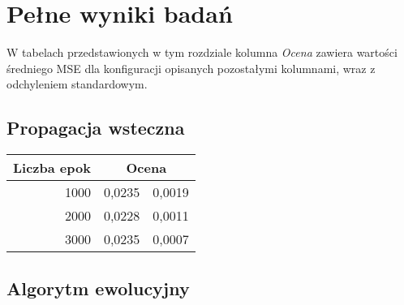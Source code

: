 \documentclass[11pt,a4paper,oneside]{report}
\begin{document}
\appendix 
\chapter{Pełne wyniki badań}
\label{chap:appendix}

W tabelach przedstawionych w tym rozdziale kolumna \textit{Ocena} zawiera wartości średniego MSE dla konfiguracji opisanych pozostałymi kolumnami, wraz z odchyleniem standardowym.

\section{Propagacja wsteczna}

\begin{center}
	\begin{longtable}{|r|r@{$\pm$}r|}
		\hline
		\multicolumn{1}{|c|}{Liczba epok} & \multicolumn{2}{|c|}{Ocena}\\ \hline \hline\endhead
		1000 & 0,0235 & 0,0019 \\ \hline
		2000 & 0,0228 & 0,0011\\ \hline
		3000 & 0,0235 & 0,0007\\ \hline
	\end{longtable}
\end{center}

\section{Algorytm ewolucyjny}
\end{document}
